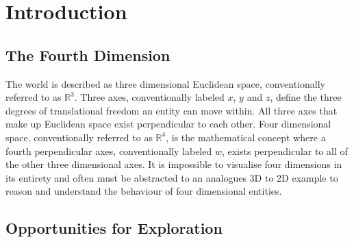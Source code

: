 \documentclass{l4proj}
\begin{document}



\chapter{Introduction}


\section{The Fourth Dimension}

The world is described as three dimensional Euclidean space, conventionally referred to as $\mathbb{R}^3$. Three axes, conventionally labeled \(x\), \(y\) and \(z\), define the three degrees of translational freedom an entity can move within. All three axes that make up Euclidean space exist perpendicular to each other. Four dimensional space, conventionally referred to as $\mathbb{R}^4$, is the mathematical concept where a fourth perpendicular axes, conventionally labeled \(w\), exists perpendicular to all of the other three dimensional axes. It is impossible to visualise four dimensions in its entirety and often must be abstracted to an analogues 3D to 2D example to reason and understand the behaviour of four dimensional entities. 

\section{Opportunities for Exploration}
\end{document}
